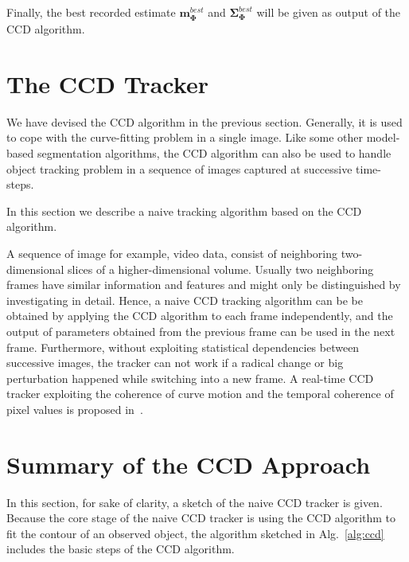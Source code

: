 Finally, the best recorded estimate
$\mathbf{m}_{\mathbf{\Phi}}^{best}$ and
$\mathbf{\Sigma}_{\mathbf{\Phi}}^{best}$ will be given as output of the
CCD algorithm.


\section{The CCD Tracker}
\label{sec:vg}

We have devised the CCD algorithm in the previous section. Generally,
it is used to cope with the curve-fitting problem in a single
image. Like some other model-based segmentation algorithms, the CCD
algorithm can also be used to handle object tracking problem in a
sequence of images captured at successive time-steps. %

In this section we describe a naive tracking algorithm based on the CCD
algorithm.

A sequence of image for example, video data, consist of neighboring two-dimensional slices of a
higher-dimensional volume. Usually two neighboring frames have similar
information and features and might only be distinguished by
investigating in detail. Hence, a naive CCD tracking algorithm can be
 be obtained by applying the CCD algorithm to each frame
 independently, and the output of parameters obtained from  the
 previous frame can be used in the next frame. %
 Furthermore, without exploiting
 statistical dependencies between successive images, the tracker can
 not work if a radical change or big perturbation happened while
 switching into a new frame. A real-time CCD tracker exploiting the
 coherence of curve motion and the temporal coherence of pixel values
 is proposed in~\cite{hanek2004fitting}. 


\section{Summary of the CCD Approach}
\label{sec:sccd}
In this section,  for sake of clarity, a sketch of the naive CCD
tracker is given. Because the core stage of the naive CCD tracker
is using the CCD algorithm to fit the contour of an observed
object, the algorithm sketched in Alg.~\ref{alg:ccd} includes the basic steps of the CCD
algorithm.

